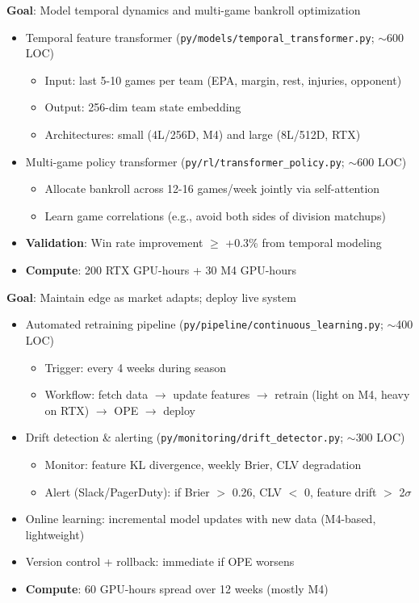 \textbf{Goal}: Model temporal dynamics and multi-game bankroll optimization

\begin{itemize}
  \item {} Temporal feature transformer (\texttt{py/models/temporal\_transformer.py}; $\sim$600 LOC)
  \begin{itemize}
    \item Input: last 5-10 games per team (EPA, margin, rest, injuries, opponent)
    \item Output: 256-dim team state embedding
    \item Architectures: small (4L/256D, M4) and large (8L/512D, RTX)
  \end{itemize}
  \item {} Multi-game policy transformer (\texttt{py/rl/transformer\_policy.py}; $\sim$600 LOC)
  \begin{itemize}
    \item Allocate bankroll across 12-16 games/week jointly via self-attention
    \item Learn game correlations (e.g., avoid both sides of division matchups)
  \end{itemize}
  \item {} \textbf{Validation}: Win rate improvement $\ge$ +0.3\% from temporal modeling
  \item \textbf{Compute}: 200 RTX GPU-hours + 30 M4 GPU-hours
\end{itemize}

\textbf{Goal}: Maintain edge as market adapts; deploy live system

\begin{itemize}
  \item {} Automated retraining pipeline (\texttt{py/pipeline/continuous\_learning.py}; $\sim$400 LOC)
  \begin{itemize}
    \item Trigger: every 4 weeks during season
    \item Workflow: fetch data $\to$ update features $\to$ retrain (light on M4, heavy on RTX) $\to$ OPE $\to$ deploy
  \end{itemize}
  \item {} Drift detection \& alerting (\texttt{py/monitoring/drift\_detector.py}; $\sim$300 LOC)
  \begin{itemize}
    \item Monitor: feature KL divergence, weekly Brier, CLV degradation
    \item Alert (Slack/PagerDuty): if Brier $>$ 0.26, CLV $<$ 0, feature drift $>$ 2$\sigma$
  \end{itemize}
  \item {} Online learning: incremental model updates with new data (M4-based, lightweight)
  \item {} Version control + rollback: immediate if OPE worsens
  \item \textbf{Compute}: 60 GPU-hours spread over 12 weeks (mostly M4)
\end{itemize}

